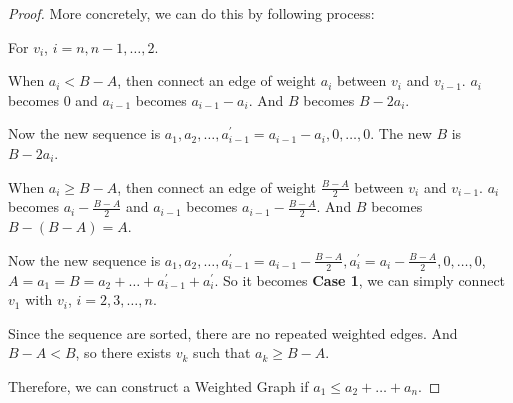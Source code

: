 \begin{exercise}
\begin{proof}
    More concretely, we can do this by following process:

    For $v_i$, $i=n, n-1, \dots, 2$.

    When $a_i < B - A$, then connect an edge of weight $a_i$ between $v_i$ and $v_{i-1}$. $a_i$ becomes 0 and $a_{i-1}$ becomes $a_{i-1} - a_i$. And $B$ becomes $B - 2 a_i$.

    Now the new sequence is $a_1, a_2, \dots, a_{i-1}^\prime = a_{i-1} - a_i, 0, \dots, 0$. The new $B$ is $B - 2 a_i$.

    When $a_i \geq B - A$, then connect an edge of weight $\frac{B-A}{2}$ between $v_i$ and $v_{i-1}$. $a_i$ becomes $a_i - \frac{B-A}{2}$ and $a_{i-1}$ becomes $a_{i-1} - \frac{B-A}{2}$. And $B$ becomes $B - (B-A)=A$.

    Now the new sequence is $a_1, a_2, \dots, a_{i-1}^\prime = a_{i-1} - \frac{B-A}{2}, a_i^\prime = a_i - \frac{B-A}{2}, 0, \dots, 0$, $A = a_1 = B = a_2 + \dots + a_{i-1}^\prime + a_i^\prime$. So it becomes \textbf{Case 1}, we can simply connect $v_1$ with $v_i$, $i=2,3,\dots,n$.

    Since the sequence are sorted, there are no repeated weighted edges. And $B-A < B$, so there exists $v_k$ such that $a_k \geq B - A$.

    Therefore, we can construct a Weighted Graph if $a_1 \leq a_2 + \dots + a_n$.


    \end{proof}
\end{exercise}

